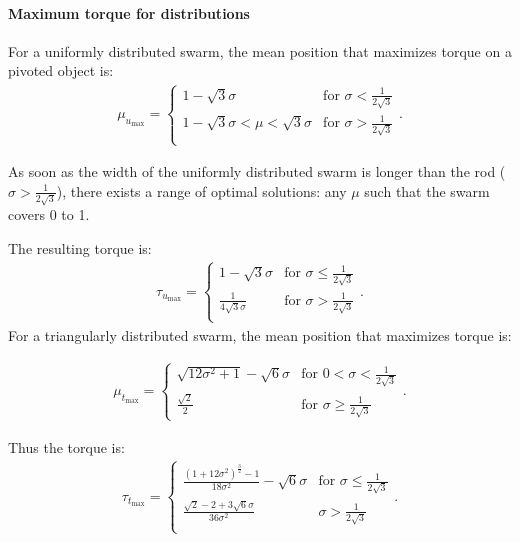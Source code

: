 \paragraph{Maximum torque for distributions}
For a uniformly distributed swarm, the mean position that maximizes torque on a pivoted object is:
\begin{align}\label{eq:maxMuPivot}
\mu_{u_\max}=\left\{
\begin{array}{ll}
1-\sqrt{3}\sigma &   \textrm{for     } \sigma < \frac{1}{2\sqrt{3}}\\
1-\sqrt{3}\sigma<\mu<\sqrt{3}\sigma &   \textrm{for     } \sigma > \frac{1}{2\sqrt{3}}\\
\end{array} 
\right. .
\end{align}

As soon as the width of the uniformly distributed swarm is longer than the rod ($\sigma > \frac{1}{2\sqrt{3}}$), there exists a range of optimal solutions: any $\mu$ such that the swarm covers 0 to 1.

The resulting torque is:
\begin{align}
\label{eq:MaxTorqueUniformPivot}
\tau_{u_{\max}} =\left\{
\begin{array}{ll}
1-\sqrt{3}\sigma &   \textrm{for     } \sigma \leq \frac{1}{2\sqrt{3}}\\
\frac{1}{4 \sqrt{3}\sigma} & \textrm{for     }  \sigma > \frac{1}{2\sqrt{3}}\\
\end{array} 
\right. .
\end{align}
For a triangularly distributed swarm, the mean position that maximizes torque is:

\begin{align}
\mu_{t_\max}= \left\{
\begin{array}{ll}
 \sqrt{12\sigma^2 +1}  -\sqrt{6}\sigma &   \textrm{for     } 0< \sigma  <\frac{1}{2\sqrt{3}} \\
 \frac{\sqrt{2}}{2} &   \textrm{for     } \sigma \geq \frac{1}{2\sqrt{3}} 
\end{array} 
\right. .
\end{align}

Thus the torque is:
\begin{align}\label{eq:triMaxTorque}
\tau_{t_\max} =\left\{
\begin{array}{ll}
\frac{ (1+12\sigma^2)^{\frac{3}{2}}-1}{18\sigma^2} - \sqrt{6}\sigma &   \textrm{for     } \sigma \leq \frac{1}{2\sqrt{3}}\\
\frac{\sqrt{2}-2+3\sqrt{6}\sigma}{36\sigma^2} &   \sigma > \frac{1}{2\sqrt{3}}\\
\end{array} 
\right. .
\end{align}


